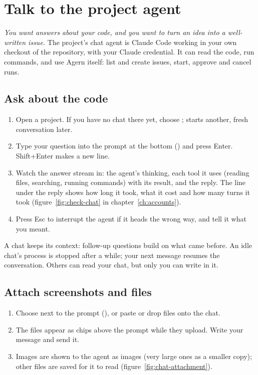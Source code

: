 \chapter{Talk to the project agent}\label{ch:chat}

\emph{You want answers about your code, and you want to turn an idea into a well-written issue.}
The project's chat agent is Claude Code working in your own checkout of the repository, with your
Claude credential. It can read the code, run commands, and use Agern itself: list and create
issues, start, approve and cancel runs.

\section{Ask about the code}\label{sec:ask}

\begin{enumerate}
  \item Open a project. If you have no chat there yet, choose ; 
    starts another, fresh conversation later.
  \item Type your question into the prompt at the bottom ()
    and press Enter. Shift+Enter makes a new line.
  \item Watch the answer stream in: the agent's thinking, each tool it uses (reading files,
    searching, running commands) with its result, and the reply. The line under the reply shows
    how long it took, what it cost and how many turns it took (figure~\ref{fig:check-chat} in
    chapter~\ref{ch:accounts}).
  \item Press Esc to interrupt the agent if it heads the wrong way, and tell it what you meant.
\end{enumerate}

A chat keeps its context: follow-up questions build on what came before. An idle chat's process
is stopped after a while; your next message resumes the conversation. Others can read your chat,
but only you can write in it.

\section{Attach screenshots and files}\label{sec:attachments}

\begin{enumerate}
  \item Choose \ui{+} next to the prompt (), or paste or drop files onto the chat.
  \item The files appear as chips above the prompt while they upload. Write your message and send it.
  \item Images are shown to the agent as images (very large ones as a smaller copy); other files are
    saved for it to read (figure~\ref{fig:chat-attachment}).
\end{enumerate}

